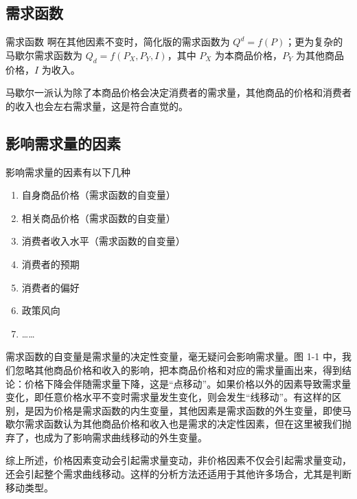 \subsection{需求函数}

\begin{definition}[breakable]{需求函数}
    啊在其他因素不变时，简化版的需求函数为 $Q^d=f\left(P\right)$；更为复杂的马歇尔需求函数为 $Q_d=f\left(P_X,P_Y,I\right)$，其中 $P_X$ 为本商品价格，$P_Y$ 为其他商品价格，$I$ 为收入。
\end{definition}

马歇尔一派认为除了本商品价格会决定消费者的需求量，其他商品的价格和消费者的收入也会左右需求量，这是符合直觉的。

\subsection{影响需求量的因素}

影响需求量的因素有以下几种
\begin{enumerate}
    \item 自身商品价格（需求函数的自变量）
    \item 相关商品价格（需求函数的自变量）
    \item 消费者收入水平（需求函数的自变量）
    \item 消费者的预期
    \item 消费者的偏好
    \item 政策风向
    \item ……
\end{enumerate}

需求函数的自变量是需求量的决定性变量，毫无疑问会影响需求量。图 1-1 中，我们忽略其他商品价格和收入的影响，把本商品价格和对应的需求量画出来，得到结论：价格下降会伴随需求量下降，这是“点移动”。如果价格以外的因素导致需求量变化，即任意价格水平不变时需求量发生变化，则会发生“线移动”。有这样的区别，是因为价格是需求函数的内生变量，其他因素是需求函数的外生变量，即使马歇尔需求函数认为其他商品价格和收入也是需求的决定性因素，但在这里被我们抛弃了，也成为了影响需求曲线移动的外生变量。

综上所述，价格因素变动会引起需求量变动，非价格因素不仅会引起需求量变动，还会引起整个需求曲线移动。这样的分析方法还适用于其他许多场合，尤其是判断移动类型。

